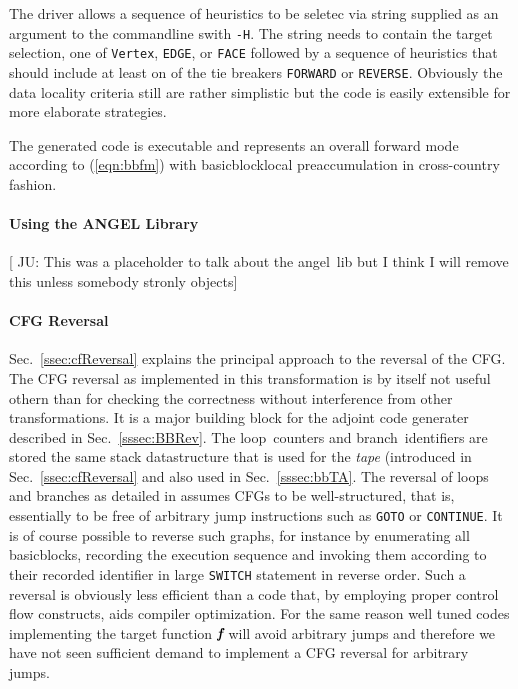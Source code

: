 \documentclass[11pt]{article}
\newcommand{\angel}{angel}
\newcommand{\Loop}{loop}
\newcommand{\branch}{branch}
\newcommand{\basicblock}{basicblock}
\newcommand{\bmf}{\mbox{\bf\em f}}
\newcommand{\code}[1]{{\small\tt{#1}}}
\newcommand{\refsec}[1]{{Sec.~\ref{#1}}}
\newcommand{\refeqn}[1]{{(\ref{#1})}}
\begin{document}
The driver allows a sequence of heuristics to be seletec via string supplied as 
an argument to the commandline swith \code{-H}. The string needs to contain 
the target selection, one of \code{Vertex}, \code{EDGE}, or \code{FACE} followed by 
a sequence of heuristics that should include at least on of the tie breakers \code{FORWARD} or 
\code{REVERSE}. 
Obviously the data locality criteria still are rather simplistic but 
the code is easily extensible for more elaborate strategies. 

The generated code is executable and represents an overall forward mode 
according to \refeqn{eqn:bbfm} with \basicblock\-local preaccumulation in 
cross-country fashion. 

\paragraph{Using the ANGEL Library}\label{sssec:angel}
{\color{red} [ JU: This was a placeholder to talk about the \angel\ lib 
  but I think I will remove this unless somebody stronly objects]}
\paragraph{CFG Reversal}\label{sssec:cfgRevAlg}

\refsec{ssec:cfReversal} explains the principal approach to the reversal 
of the CFG. The CFG reversal as implemented in this transformation is 
by itself not useful othern than for checking the correctness without 
interference from other transformations. It is a major building block for 
the  
adjoint code generater described in \refsec{sssec:BBRev}. 
The \Loop\ counters and \branch\ identifiers are stored the same 
stack datastructure that is used for the {\em tape} (introduced in 
\refsec{ssec:cfReversal} and also used in \refsec{sssec:bbTA}.  
The reversal of loops and branches as detailed in \cite{NULF04CFR} assumes 
CFGs to be well-structured, that is, essentially to be free of arbitrary jump instructions 
such as \code{GOTO} or \code{CONTINUE}. 
It is of course possible to reverse such graphs, for instance by enumerating
all {\basicblock}s, recording the execution sequence and invoking them according 
to their recorded identifier in  large  \code {SWITCH} statement in reverse order.
Such a reversal is obviously less efficient than a code that, by employing proper 
control flow constructs, aids compiler optimization. 
For the same reason well tuned codes implementing the target function $\bmf$ will 
avoid arbitrary jumps and therefore we have not seen sufficient demand to implement 
a CFG reversal for arbitrary jumps. 
\end{document}
